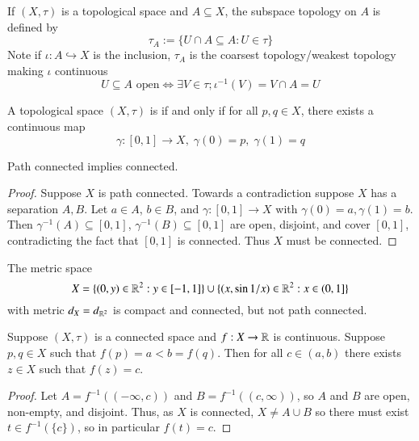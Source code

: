 \begin{defn}
    If $(X,\tau)$ is a topological space and $A \subseteq X$, the subspace topology on $A$ is defined by \begin{equation*}
        \tau_A := \{U\cap A \subseteq A: U \in \tau\}
    \end{equation*}
    Note if $\iota:A\hookrightarrow X$ is the inclusion, $\tau_A$ is the coarsest topology/weakest topology making $\iota$ continuous $$U \subseteq A\text{ open} \iff \exists V \in \tau;\iota^{-1}(V) = V\cap A = U$$
\end{defn}

\begin{defn}
    A topological space $(X,\tau)$ is  if and only if for all $p,q \in X$, there exists a continuous map $$\gamma:[0,1]\rightarrow X,\;\gamma(0) = p,\;\gamma(1) = q$$
\end{defn}

\begin{prop}\label{prop:3.1.7}
    Path connected implies connected.
\end{prop}
\begin{proof}
    Suppose $X$ is path connected. Towards a contradiction suppose $X$ has a separation $A,B$. Let $a \in A$, $b \in B$, and $\gamma:[0,1]\rightarrow X$ with $\gamma(0) = a,\gamma(1) = b$. Then $\gamma^{-1}(A) \subseteq [0,1]$, $\gamma^{-1}(B) \subseteq [0,1]$ are open, disjoint, and cover $[0,1]$, contradicting the fact that $[0,1]$ is connected. Thus $X$ must be connected.
\end{proof}

\begin{eg}
    The metric space \begin{equation*}
        X = \{(0,y) \in\mathbb R^2:y\in[-1,1]\}\cup\{(x,\sin 1/x)\in \mathbb R^2:x \in (0,1]\}
    \end{equation*}
    with metric $d_X = d_{\mathbb R^2}$ is compact and connected, but not path connected.
\end{eg}

\begin{namthm}
    Suppose $(X,\tau)$ is a connected space and $f:X\rightarrow \mathbb R$ is continuous. Suppose $p,q \in X$ such that $f(p) = a < b = f(q)$. Then for all $c \in (a,b)$ there exists $z \in X$ such that $f(z) = c$.
\end{namthm}
\begin{proof}
    Let $A = f^{-1}((-\infty,c))$ and $B = f^{-1}((c,\infty))$, so $A$ and $B$ are open, non-empty, and disjoint. Thus, as $X$ is connected, $X \neq A \cup B$ so there must exist $t \in f^{-1}(\{c\})$, so in particular $f(t) =c$.
\end{proof}


